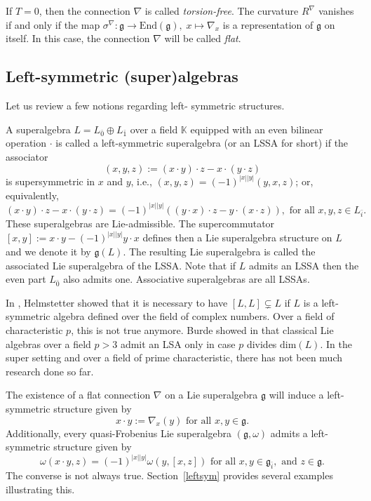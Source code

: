 \documentclass[12pt]{amsart}
\begin{document}
If $T=0$, then the connection $\nabla$ is called {\it torsion-free}. The curvature $R^\nabla$ vanishes if and only if the map $\sigma^\nabla:  \mathfrak{g} \rightarrow \mathrm{End}(\mathfrak{g}), \; x \mapsto \nabla_x$ is a representation of $\mathfrak{g}$ on itself. In this case, the connection $\nabla$ will be called {\it flat}. 

\subsection{Left-symmetric (super)algebras}
Let us review a few notions regarding left- symmetric structures. 

A superalgebra $L =L_{\bar 0} \oplus L_{\bar 1}$ over a field $\mathbb K$ equipped with an even  bilinear operation $\cdot$ is called a left-symmetric superalgebra (or an LSSA for short) if the associator 
\[
(x, y, z) :=(x \cdot y) \cdot z- x  \cdot (y \cdot z)
\]
is supersymmetric in $x$ and $y$, i.e., $(x, y, z) =(-1)^{|x||y|}(y, x, z)$; or, equivalently,
\[
(x \cdot y) \cdot z - x \cdot (y \cdot z) = (-1)^{|x||y|}((y \cdot x) \cdot z-y \cdot (x \cdot z)), \text{ for all } x, y,z \in L_{\bar i}. 
\]
These superalgebras are Lie-admissible. The supercommutator $[x, y] :=x \cdot y-(-1)^{|x||y|} y \cdot x$ defines then a Lie superalgebra structure on $L$ and we denote it by ${\mathfrak g}(L)$. The resulting Lie superalgebra is called the associated Lie superalgebra of the LSSA. Note that if $L$ admits an LSSA then the even part $L_{\bar 0}$ also admits one. Associative superalgebras are all LSSAs. 

In \cite{H}, Helmstetter showed  that it is necessary to have $[L,L] \subsetneq L$ if $L$ is a left-symmetric algebra defined over the field of complex numbers. Over a field of characteristic $p$, this is not true anymore. Burde showed in \cite{B2} that classical Lie algebras over a field $p>3$ admit an LSA only in case $p$ divides $\mathrm{dim}(L)$.  In the super setting and over a field of prime characteristic, there has not been much research done so far. 

The existence of a flat connection $\nabla$ on a Lie superalgebra $\mathfrak g$ will induce a left-symmetric structure given by 
\[
x\cdot y:=\nabla_x(y) \text{ for all }x,y \in {\mathfrak g}.
\]
Additionally, every quasi-Frobenius Lie superalgebra $({\mathfrak g}, \omega) $ admits a left-symmetric structure given by
\[
\omega(x\cdot y, z)=(-1)^{|x||y|}\omega(y, [x,z]) \text{ for all }x,y \in {\mathfrak g}_{\bar i}, \text{ and } z \in {\mathfrak g}.
\]
The converse is not always true. Section~\ref{leftsym} provides several examples illustrating this. 
\end{document}

